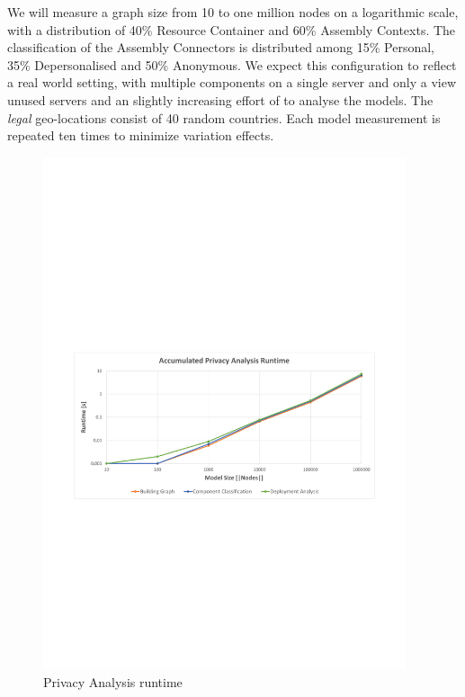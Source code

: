 We will measure a graph size from 10 to one million nodes on a logarithmic scale, with a distribution of 40\% Resource Container and 60\% Assembly Contexts. The classification of the Assembly Connectors is distributed among 15\% Personal, 35\% Depersonalised and 50\% Anonymous. We expect this configuration to reflect a real world setting, with multiple components on a single server and only a view unused servers and an slightly increasing effort of to analyse the models. The \textit{legal} geo-locations consist of 40 random countries. Each model measurement is repeated ten times to minimize variation effects.

\begin{figure}[h]
	\centering
	\includegraphics[trim = 15mm 95mm 13mm 110mm, clip, width=0.95\textwidth]{graphs/Runtime_pa}
	\caption{Privacy Analysis runtime}
	\label{fig:eval:pa:runtime}
\end{figure}


